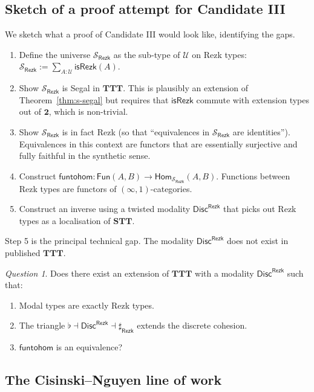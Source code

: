 \documentclass[12pt]{article}
\theoremstyle{definition}
\theoremstyle{remark}
\newtheorem{question}[theorem]{Question}
\newcommand{\U}{\mathcal{U}}
\newcommand{\Hom}{\mathsf{Hom}}
\newcommand{\Fun}{\mathsf{Fun}}
\newcommand{\funtohom}{\mathsf{funtohom}}
\newcommand{\isRezk}{\mathsf{isRezk}}
\newcommand{\Disc}{\mathsf{Disc}}
\newcommand{\STT}{\mathbf{STT}}
\newcommand{\TTT}{\mathbf{TTT}}
\newcommand{\twoI}{\mathbf{2}}
\begin{document}
\subsection{Sketch of a proof attempt for Candidate III}

We sketch what a proof of Candidate III would look like, identifying the gaps.

\begin{enumerate}
\item Define the universe $\mathcal{S}_{\mathsf{Rezk}}$ as the sub-type of $\U$ on Rezk types: $\mathcal{S}_{\mathsf{Rezk}} := \sum_{A : \U} \isRezk(A)$.
\item Show $\mathcal{S}_{\mathsf{Rezk}}$ is Segal in $\TTT$. This is plausibly an extension of Theorem~\ref{thm:s-segal} but requires that $\isRezk$ commute with extension types out of $\twoI$, which is non-trivial.
\item Show $\mathcal{S}_{\mathsf{Rezk}}$ is in fact Rezk (so that ``equivalences in $\mathcal{S}_{\mathsf{Rezk}}$ are identities''). Equivalences in this context are functors that are essentially surjective and fully faithful in the synthetic sense.
\item Construct $\funtohom : \Fun(A,B) \to \Hom_{\mathcal{S}_{\mathsf{Rezk}}}(A,B)$. Functions between Rezk types are functors of $(\infty,1)$-categories.
\item Construct an inverse using a twisted modality $\Disc^{\mathsf{Rezk}}$ that picks out Rezk types as a localisation of $\STT$.
\end{enumerate}

Step 5 is the principal technical gap. The modality $\Disc^{\mathsf{Rezk}}$ does not exist in published $\TTT$.

\begin{question}\label{q:rezk-modality}
Does there exist an extension of $\TTT$ with a modality $\Disc^{\mathsf{Rezk}}$ such that:
\begin{enumerate}
\item Modal types are exactly Rezk types.
\item The triangle $\flat \dashv \Disc^{\mathsf{Rezk}} \dashv \sharp_{\mathsf{Rezk}}$ extends the discrete cohesion.
\item $\funtohom$ is an equivalence?
\end{enumerate}
\end{question}

\subsection{The Cisinski--Nguyen line of work}
\end{document}
